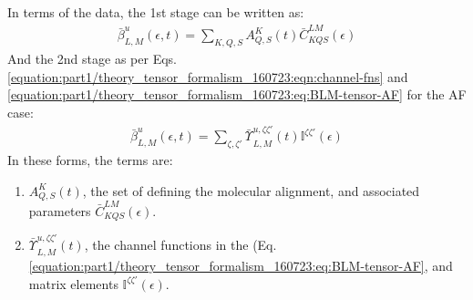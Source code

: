 \documentclass[letterpaper,table,10pt,english]{jupyterBook}
\begin{document}
\sphinxAtStartPar
In terms of the data, the 1st stage can be written as:
\begin{equation}\label{equation:part1/numerics_070723:eqn:beta-convolution-C}
\begin{split}
\bar{\beta}_{L,M}^{u}(\epsilon,t)=\sum_{K,Q,S}A_{Q,S}^{K}(t)\bar{C}_{KQS}^{LM}(\epsilon)
\end{split}
\end{equation}
\sphinxAtStartPar
And the 2nd stage as per Eqs. \eqref{equation:part1/theory_tensor_formalism_160723:eqn:channel-fns} and \eqref{equation:part1/theory_tensor_formalism_160723:eq:BLM-tensor-AF} for the AF case:
\begin{equation}\label{equation:part1/numerics_070723:eqn:beta-convolution-stage2}
\begin{split}
\bar{\beta}_{L,M}^{u}(\epsilon,t)=\sum_{\zeta,\zeta'}\bar{\varUpsilon_{}}_{L,M}^{u,\zeta\zeta'}(t)\mathbb{I}^{\zeta\zeta'}(\epsilon)
\end{split}
\end{equation}
\sphinxAtStartPar
In these forms, the terms are:
\begin{enumerate}
%
\item {} 
\sphinxAtStartPar
\(A_{Q,S}^{K}(t)\), the set of {\hyperref[\detokenize{backmatter/glossary:term-ADMs}]{}} defining the molecular alignment, and associated parameters \(\bar{C}_{KQS}^{LM}(\epsilon)\).

\item {} 
\sphinxAtStartPar
\(\bar{\varUpsilon_{}}_{L,M}^{u,\zeta\zeta'}(t)\), the channel functions in the {\hyperref[\detokenize{backmatter/glossary:term-AF}]{}} (Eq. \eqref{equation:part1/theory_tensor_formalism_160723:eq:BLM-tensor-AF}, and matrix elements \(\mathbb{I}^{\zeta\zeta'}(\epsilon)\).

\end{enumerate}
\end{document}

